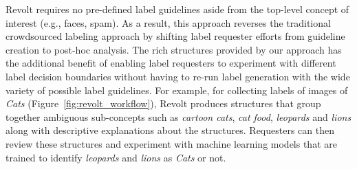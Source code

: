 Revolt requires no pre-defined label guidelines aside from the top-level concept of interest (e.g., faces, spam). As a result, this approach reverses the traditional crowdsourced labeling approach by shifting label requester efforts from guideline creation to post-hoc analysis. The rich structures provided by our approach has the additional benefit of enabling label requesters to experiment with different label decision boundaries without having to re-run label generation with the wide variety of possible label guidelines. For example, for collecting labels of images of \emph{Cats} (Figure~\ref{fig:revolt_workflow}), Revolt produces structures that group together ambiguous sub-concepts such as \emph{cartoon cats}, \emph{cat food}, \emph{leopards} and \emph{lions} along with descriptive explanations about the structures. Requesters can then review these structures and experiment with machine learning models that are trained to identify \emph{leopards} and \emph{lions} as \emph{Cats} or not. 


